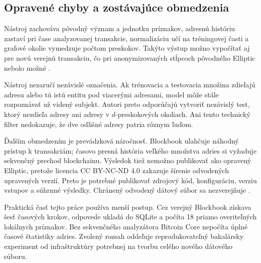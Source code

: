 \subsection{Opravené chyby a zostávajúce obmedzenia}

Nástroj zachováva pôvodný význam a jednotku príznakov, adresnú históriu
zastaví pri čase analyzovanej transakcie, normalizáciu učí na
tréningovej časti a grafové okolie vymedzuje
počtom preskokov. Takýto výstup možno vypočítať aj pre novú verejnú
transakciu, čo pri anonymizovaných stĺpcoch pôvodného Elliptic nebolo
možné \cite{safar2026elliptic}.

Nástroj nezaručí nezávislé označenia. Ak trénovacia a
testovacia množina zdieľajú adresu alebo tú istú entitu pod viacerými
adresami, model môže stále rozpoznávať už videný subjekt. Autori preto
odporúčajú vytvoriť nezávislý test, ktorý nezdieľa adresy ani adresy v
$d$-preskokových okoliach. Ani tento technický filter nedokazuje, že dve
odlišné adresy patria rôznym ľuďom.

Ďalším obmedzením je prevádzková náročnosť. Blockbook uľahčuje náhodný
prístup k transakciám; časovo presná história veľkého množstva adries
si vyžaduje sekvenčný prechod blockchainu. Výsledok tiež nemožno
publikovať ako opravený Elliptic, pretože licencia
CC BY-NC-ND 4.0 zakazuje šírenie odvodených upravených verzií. Preto je
potrebné publikovať zdrojový kód, konfiguráciu, verziu vstupov a súhrnné
výsledky. Chránený odvodený dátový súbor sa nezverejňuje
\cite{safar2026elliptic}.

Praktická časť tejto práce používa menší postup. Cez verejný Blockbook
získava šesť časových krokov, odpovede ukladá do SQLite a počíta 18
priamo overiteľných lokálnych príznakov. Bez sekvenčného analyzátora
Bitcoin Core nepočíta úplné časové štatistiky adries. Zvolený rozsah
oddeľuje reprodukovateľný bakalársky experiment od infraštruktúry
potrebnej na tvorbu celého nového dátového súboru.
